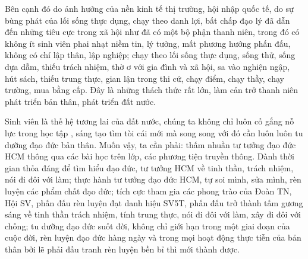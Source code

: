 Bên cạnh đó do ảnh hưởng của nền kinh tế thị trường, hội nhập quốc tế, do sự bùng phát của lối sống thực dụng, chạy theo danh lợi, bất chấp đạo lý đã dẫn đến những tiêu cực trong xã hội như đã có một bộ phận thanh niên, trong đó có không ít sinh viên phai nhạt niềm tin, lý tưởng, mất phương hướng phấn đấu, không có chí lập thân, lập nghiệp; chạy theo lối sống thực dụng, sống thử, sống dựa dẫm, thiếu trách nhiệm, thờ ơ với gia đình và xã hội, sa vào nghiện ngập, hút sách, thiếu trung thực, gian lận trong thi cử, chạy điểm, chạy thầy, chạy trường, mua bằng cấp. Đây là những thách thức rất lớn, làm cản trở thanh niên phát triển bản thân, phát triển đất nước.

Sinh viên là thế hệ tương lai của đất nước, chúng ta không chỉ luôn cố gắng nỗ lực trong học tập , sáng tạo tìm tòi cái mới mà song song với đó cần luôn luôn tu dưỡng đạo đức bản thân. Muốn vậy, ta cần phải: thấm nhuần tư tưởng đạo đức HCM thông qua các bài học trên lớp, các phương tiện truyền thông. Dành thời gian thỏa đáng để tìm hiểu đạo đức, tư tưởng HCM về tinh thần, trách nhiệm, nói đi đôi với làm; thực hành tư tưởng đạo đức HCM, tự soi mình, sửa mình, rèn luyện các phẩm chất đạo đức; tích cực tham gia các phong trào của Đoàn TN, Hội SV, phấn đấu rèn luyện đạt danh hiệu SV5T, phấn đấu trở thành tấm gương sáng về tinh thần trách nhiệm, tính trung thực, nói đi đôi với làm, xây đi đôi với chống; tu dưỡng đạo đức suốt đời, không chỉ giới hạn trong một giai đoạn của cuộc đời, rèn luyện đạo đức hàng ngày và trong mọi hoạt động thực tiễn của bản thân bởi lẽ phải đấu tranh rèn luyện bền bỉ thì mới thành được.

\cleardoublepage